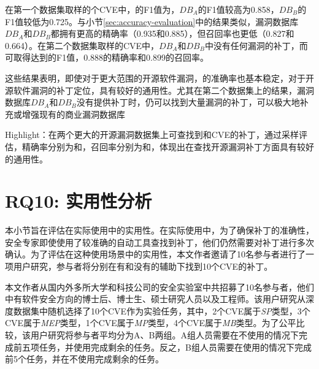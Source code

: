 在第一个数据集取样的个CVE中，\tool 的F1值为，$DB_A$的F1值较高为0.858，$DB_B$的F1值较低为0.725。与小节\ref{sec:accuracy-evaluation}中的结果类似，漏洞数据库$DB_A$和$DB_B$都拥有更高的精确率（0.935和0.885），但召回率也更低（0.827和0.664）。在第二个数据集取样的CVE中，$DB_A$和$DB_B$中没有任何漏洞的补丁，而\tool 可取得达到的F1值，0.888的精确率和0.899的召回率。

这些结果表明，即使对于更大范围的开源软件漏洞，\tool 的准确率也基本稳定，对于开源软件漏洞的补丁定位，\tool 具有较好的通用性。尤其在第二个数据集上的结果，漏洞数据库$DB_A$和$DB_B$没有提供补丁时，\tool 仍可以找到大量漏洞的补丁，可以极大地补充或增强现有的商业漏洞数据库


\begin{tcolorbox}[size=title,opacityfill=0.15]
Highlight：\tool 在两个更大的开源漏洞数据集上可查找到和CVE的补丁，通过采样评估，精确率分别为和，召回率分别为和，体现出\tool 在查找开源漏洞补丁方面具有较好的通用性。
\end{tcolorbox}

\section{RQ10: 实用性分析}\label{sec:usefulness}
本小节旨在评估\tool 在实际使用中的实用性。在实际使用中，为了确保补丁的准确性，安全专家即使使用了较准确的自动工具查找到补丁，他们仍然需要对补丁进行多次确认。为了评估\tool 在这种使用场景中的实用性，本文作者邀请了10名参与者进行了一项用户研究，参与者将分别在有和没有\tool 的辅助下找到10个CVE的补丁。

本文作者从国内外多所大学和科技公司的安全实验室中共招募了10名参与者，他们中有软件安全方向的博士后、博士生、硕士研究人员以及工程师。该用户研究从深度数据集中随机选择了10个CVE作为实验任务，其中，2个CVE属于\textit{SP}类型，3个CVE属于\textit{MEP}类型，1个CVE属于\textit{MP}类型，4个CVE属于\textit{MB}类型。为了公平比较，该用户研究将参与者平均分为A、B两组。A组人员需要在不使用\tool 的情况下完成前五项任务，并使用\tool 完成剩余的任务。反之，B组人员需要在使用\tool 的情况下完成前5个任务，并在不使用\tool 完成剩余的任务。

